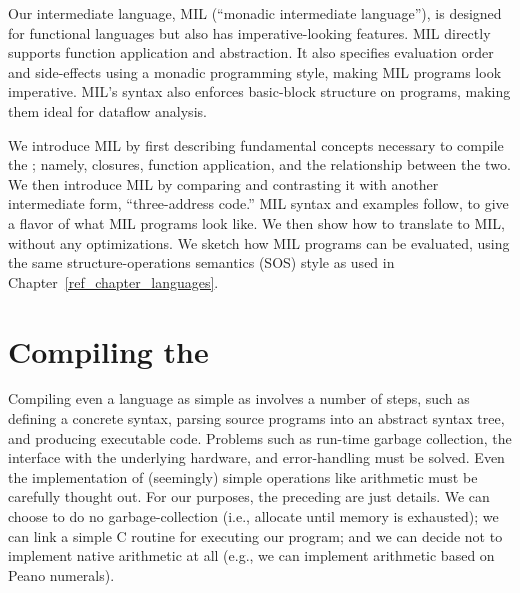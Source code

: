 \documentclass[12pt]{report}
\begin{document}
Our intermediate language, MIL (``monadic intermediate language''), is
designed for functional languages but also has imperative-looking
features. MIL directly supports function application and
abstraction. It also specifies evaluation order and side-effects using
a monadic programming style, making MIL programs look
imperative. MIL's syntax also enforces basic-block structure on
programs, making them ideal for dataflow analysis.

We introduce MIL by first describing fundamental concepts necessary to
compile the \lamA; namely, closures, function application, and the
relationship between the two. We then introduce MIL by comparing and
contrasting it with another intermediate form, ``three-address code.''
MIL syntax and examples follow, to give a flavor of what MIL programs
look like. We then show how to translate \lamC to MIL, without any
optimizations. We sketch how MIL programs can be evaluated, using the
same structure-operations semantics (SOS) style as used in
Chapter~\ref{ref_chapter_languages}.







\section{Compiling the \LamA}
\label{lang_sec1}

Compiling even a language as simple as \lamC involves a number of
steps, such as defining a concrete syntax, parsing source programs
into an abstract syntax tree, and producing executable code. Problems
such as run-time garbage collection, the interface with the underlying
hardware, and error-handling must be solved. Even the implementation
of (seemingly) simple operations like arithmetic must be carefully
thought out. For our purposes, the preceding are just details. We can
choose to do no garbage-collection (i.e., allocate until memory is
exhausted); we can link a simple C routine for executing our program;
and we can decide not to implement native arithmetic at all (e.g., we
can implement arithmetic based on Peano numerals).
\end{document}
